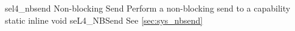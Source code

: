 %
%
%
%

\apidoc
{sel4_nbsend}
{Non-blocking Send}
{Perform a non-blocking send to a capability}
{static inline void seL4\_NBSend}
{
}
{\noret}
{See \autoref{sec:sys_nbsend}}
